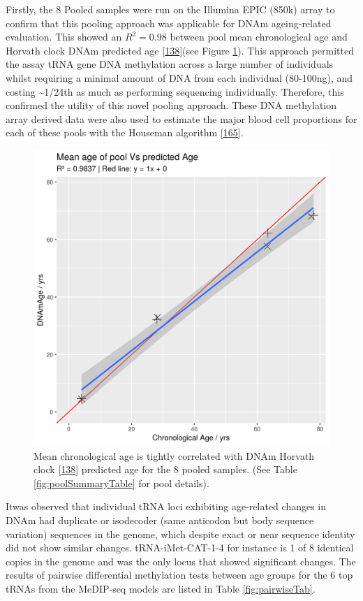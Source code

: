 \documentclass[
]{book}
\begin{document}
Firstly, the 8 Pooled samples were run on the Illumina EPIC (850k) array to confirm that this pooling approach was applicable for DNAm ageing-related evaluation.
This showed an \(R^2 = 0.98\) between pool mean chronological age and Horvath clock DNAm predicted age {[}\protect\hyperlink{ref-Horvath2013}{138}{]}(see Figure \ref{fig:DNAmAgeVsChronAge}).
This approach permitted the assay tRNA gene DNA methylation across a large number of individuals whilst requiring a minimal amount of DNA from each individual (80-100ng), and costing \textasciitilde1/24th as much as performing sequencing individually.
Therefore, this confirmed the utility of this novel pooling approach.
These DNA methylation array derived data were also used to estimate the major blood cell proportions for each of these pools with the Houseman algorithm {[}\protect\hyperlink{ref-Houseman2012}{165}{]}.

\begin{figure}

{\centering \includegraphics[width=0.6\linewidth]{./figs/DNAmAgeVsChronAge} 

}

\caption{Mean chronological age is tightly correlated with DNAm Horvath clock {[}\protect\hyperlink{ref-Horvath2013}{138}{]} predicted age for the 8 pooled samples. (See Table \ref{fig:poolSummaryTable} for pool details).}\label{fig:DNAmAgeVsChronAge}
\end{figure}



Itwas observed that individual tRNA loci exhibiting age-related changes in DNAm had duplicate or isodecoder (same anticodon but body sequence variation) sequences in the genome, which despite exact or near sequence identity did not show similar changes.
tRNA-iMet-CAT-1-4 for instance is 1 of 8 identical copies in the genome and was the only locus that showed significant changes.
The results of pairwise differential methylation tests between age groups for the 6 top tRNAs from the MeDIP-seq models are listed in Table \ref{fig:pairwiseTab}.
\end{document}
